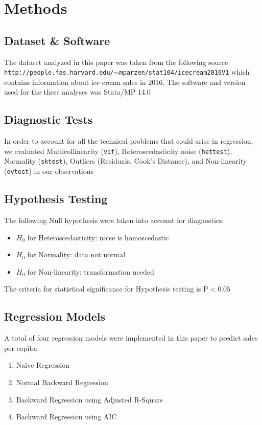 \documentclass[10pt]{article}
\begin{document}
\section{Methods}

\subsection{Dataset \& Software}
The dataset analyzed in this paper was taken from the following source\\
 {\tt http://people.fas.harvard.edu/$\sim$mparzen/stat104/icecream2016V1} which contains information about ice cream sales in 2016. The software and version used for the these analyses was Stata/MP 14.0

\subsection{Diagnostic Tests}

In order to account for all the technical problems that could arise in regression, we evaluated Multicollinearity ({\tt vif}), Heteroscedasticity noise ({\tt hettest}), Normality ({\tt sktest}), Outliers (Residuals, Cook's Distance), and Non-linearity ({\tt ovtest}) in our observations 

\subsection{Hypothesis Testing}

The following Null hypothesis were taken into account for diagnostics:
\begin{itemize}
\item $H_0$ for Heteroscedasticity: noise is homoscedastic
\item $H_0$ for Normality: data not normal 
\item $H_0$ for Non-linearity: transformation needed
\end{itemize}

The criteria for statistical significance for Hypothesis testing is P$<0.05$

\subsection{Regression Models}

A total of four regression models were implemented in this paper to predict sales per capita:
\begin{enumerate}
\item Na\"{i}ve Regression 
\item Normal Backward Regression
\item Backward Regression using Adjusted R-Square
\item Backward Regression using AIC
\end{enumerate}
\end{document}
